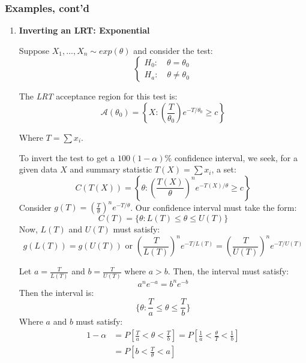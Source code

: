 \documentclass{article}
\begin{document}
\subsubsection{Examples, cont'd}
\begin{enumerate}
    \item \textbf{Inverting an LRT: Exponential}
    
    Suppose $X_1,...,X_n\sim exp(\theta)$ and consider the test:
    \begin{equation*}
        \begin{cases}
            H_0: \quad \theta = \theta_0\\
            H_a: \quad \theta \neq \theta_0
        \end{cases}
    \end{equation*}
    
    The \textit{LRT} acceptance region for this test is:
    \begin{equation*}
        \mathcal{A}(\theta_0) = \left\{X: \left( \frac{T}{\theta_0}\right) e^{-T/\theta_0} \geq c \right\}
    \end{equation*}
    
    Where $T = \sum x_i$.
    
    To invert the test to get a $100(1-\alpha)\%$ confidence interval, we seek, for a given data $X$ and summary statistic $T(X) = \sum x_i$, a set:
    \begin{equation*}
        C(T(X)) = \left\{ \theta: \left( \frac{T(X)}{\theta} \right)^n e^{-T(X)/\theta} \geq c \right\}
    \end{equation*}
    Consider $g(T) = \left(\frac{T}{\theta}\right)^n e^{-T/\theta}$. Our confidence interval must take the form:
    \begin{equation*}
        C(T) = \{\theta: L(T) \leq \theta \leq U(T) \}
    \end{equation*}
    Now, $L(T)$ and $U(T)$ must satisfy:
    \begin{equation*}
        g(L(T)) = g(U(T)) \text{ or } \left(\frac{T}{L(T)}\right)^n e^{-T/L(T)} = \left( \frac{T}{U(T)} \right)^n e^{-T/U(T)}
    \end{equation*}
    
    Let $a = \frac{T}{L(T)}$ and $b = \frac{T}{U(T)}$ where $a>b$. Then, the interval must satisfy:
    \begin{equation*}
        a^n e^{-a} = b^n e^{-b}
    \end{equation*}
    Then the interval is:
    \begin{equation*}
        \{\theta: \frac{T}{a}\leq \theta \leq \frac{T}{b} \}
    \end{equation*}
    Where $a$ and $b$ must satisfy:
    \begin{equation*}
        \begin{split}
            1-\alpha &= P\left[\frac{T}{a} < \theta < \frac{T}{b} \right] = P \left[\frac{1}{a} < \frac{\theta}{T} < \frac{1}{b} \right]\\
            &= P\left[ b < \frac{T}{\theta} < a \right]
        \end{split}
    \end{equation*}
    

\end{enumerate}
\end{document}
